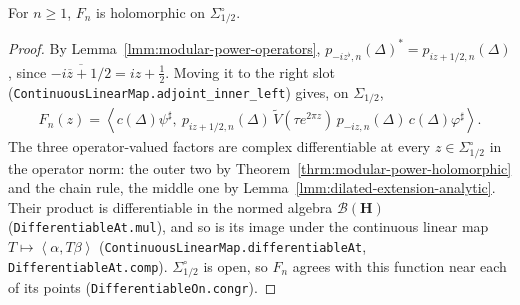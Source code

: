 \begin{lemma}
    \label{lmm:borchers-approximants-holomorphic}
    \leanok
    For $n \ge 1$, $F_n$ is holomorphic on $\Sigma^\circ_{1/2}$.
\end{lemma}
\begin{proof}
    \leanok
    By Lemma~\ref{lmm:modular-power-operators}, $p_{-iz^\flat,n}(\Delta)^* = p_{iz + 1/2,n}(\Delta)$, since $\overline{-i\overline{z} + 1/2} = iz + \tfrac{1}{2}$. Moving it to the right slot (\texttt{ContinuousLinearMap.adjoint\_inner\_left}) gives, on $\Sigma_{1/2}$,
    \begin{align}
        F_n(z) = \left< c(\Delta)\psi^\sharp, \ p_{iz + 1/2,n}(\Delta)\,\widetilde{V}(\tau e^{2\pi z})\,p_{-iz,n}(\Delta)\,c(\Delta)\varphi^\sharp \right>.
    \end{align}
    The three operator-valued factors are complex differentiable at every $z \in \Sigma^\circ_{1/2}$ in the operator norm: the outer two by Theorem~\ref{thrm:modular-power-holomorphic} and the chain rule, the middle one by Lemma~\ref{lmm:dilated-extension-analytic}. Their product is differentiable in the normed algebra $\mathcal{B}(\mathbf{H})$ (\texttt{DifferentiableAt.mul}), and so is its image under the continuous linear map $T \mapsto \left< \alpha, T\beta \right>$ (\texttt{ContinuousLinearMap.differentiableAt}, \texttt{DifferentiableAt.comp}). $\Sigma^\circ_{1/2}$ is open, so $F_n$ agrees with this function near each of its points (\texttt{DifferentiableOn.congr}).
\end{proof}

